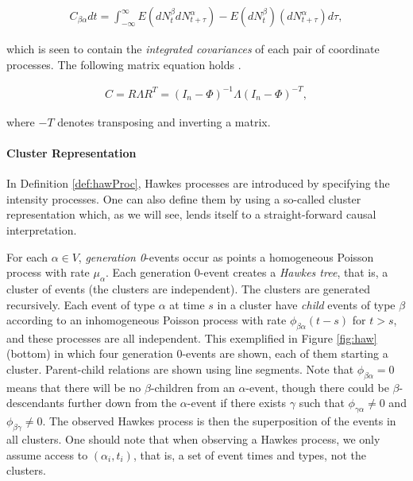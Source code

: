 \documentclass[accepted]{uai2021} %
\begin{document}
\begin{align}
	C_{\beta\alpha} dt = \int_{-\infty}^{\infty} E(dN_t^\beta 
	dN_{t+\tau}^\alpha) - E(dN_t^\beta )(dN_{t+\tau}^\alpha) d\tau,
\end{align}

which is seen to contain the \emph{integrated covariances} of each pair of 
coordinate processes. The following matrix equation holds 
\citep{jovanovic2015,	 
achab2017}.


\begin{align}
	C = R \Lambda R^T = (I_n - \Phi)^{-1}\Lambda(I_n - \Phi)^{-T},
	\label{eq:covarEq}
\end{align}


where $-T$ denotes transposing and 
inverting a matrix.


\paragraph{Cluster Representation}

In Definition \ref{def:hawProc}, Hawkes processes are introduced by specifying 
the intensity processes. One can also define them by using a so-called cluster 
representation which, as we will see, lends itself to a straight-forward causal 
interpretation.

For each $\alpha\in V$, \emph{generation 0}-events occur as points a 
homogeneous Poisson process with rate $\mu_\alpha$. Each generation 0-event 
creates a \emph{Hawkes tree}, that is, a cluster of events (the clusters are 
independent). The clusters are generated recursively. Each event of type 
$\alpha$ at time $s$ in a cluster have \emph{child} events of type $\beta$ 
according 
to an inhomogeneous Poisson process with rate $\phi_{\beta\alpha}(t-s)$ for $t 
> s$, and these processes are all independent. This exemplified in Figure 
\ref{fig:haw} (bottom) in which four 
generation 0-events are shown, each of them starting a cluster. Parent-child 
relations are shown using line segments. Note that 
$\phi_{\beta\alpha} = 0$ means that there will be no $\beta$-children from an 
$\alpha$-event, though there could be $\beta$-descendants further down from the 
$\alpha$-event if 
there exists $\gamma$ such that $\phi_{\gamma\alpha} \neq 0$ and 
$\phi_{\beta\gamma} \neq 0$. The observed Hawkes process is then the 
superposition of the events in all clusters. One should note that when 
observing a Hawkes process, we only assume access to 
$(\alpha_i, t_i)$, that is, a set of event times and types, not the clusters.
\end{document}
